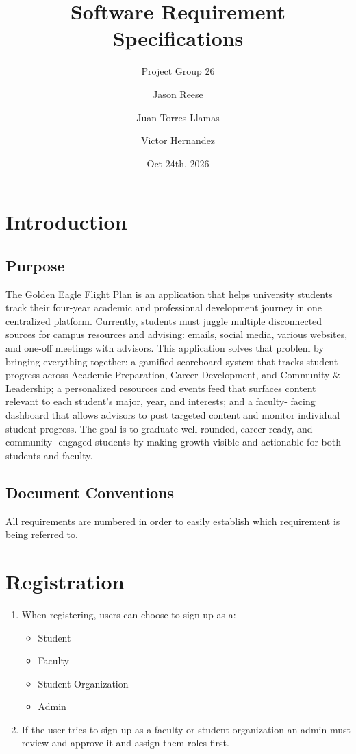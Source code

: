 \documentclass{article}
\begin{document}
\title{Software Requirement Specifications}
\author{Project Group 26}
\author{Jason Reese}
\author{Juan Torres Llamas}
\author{Victor Hernandez}
\date{Oct 24th, 2026}

\fancyhf{}
\fancyfoot[C]{\thepage}

\maketitle %
\tableofcontents
\newpage %

\section{Introduction}
\subsection{Purpose}
The Golden Eagle Flight Plan is an application that helps university students track their four-year academic and professional development journey in one centralized platform.
Currently, students must juggle multiple disconnected sources for campus resources and advising: emails, social media, various websites, and one-off meetings with advisors.
This application solves that problem by bringing everything together: a gamified scoreboard system that tracks student progress across Academic Preparation, Career
Development, and Community \& Leadership; a personalized resources and events feed that surfaces content relevant to each student's major, year, and interests; and a faculty-
facing dashboard that allows advisors to post targeted content and monitor individual student progress. The goal is to graduate well-rounded, career-ready, and community-
engaged students by making growth visible and actionable for both students and faculty.

\subsection{Document Conventions}
All requirements are numbered in order to easily establish which requirement is being referred to.

\section{Registration}
	\begin{enumerate}[leftmargin=3\parindent]
	\item When registering, users can choose to sign up as a:
		\begin{itemize}
			\item Student
			\item Faculty
			\item Student Organization
			\item Admin
		\end{itemize}
	\item If the user tries to sign up as a faculty or student organization an admin must review and approve it and assign them roles first.
	\end{enumerate}
\end{document}
